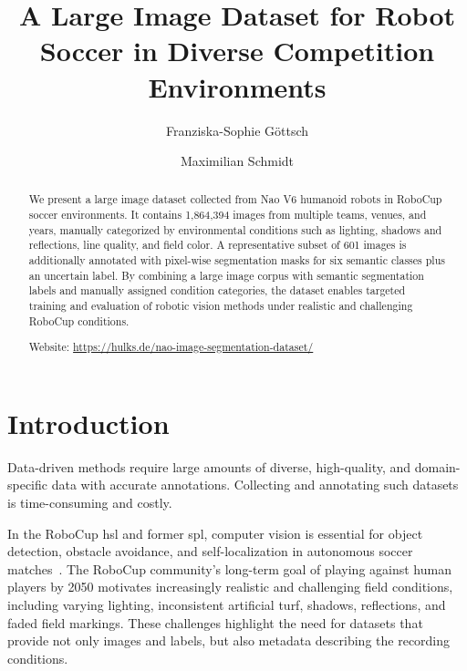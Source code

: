 \documentclass[a4paper, runningheads, orivec]{llncs}
\begin{document}
\title{A Large Image Dataset for Robot Soccer in Diverse Competition Environments}


\author{Franziska-Sophie Göttsch \and Maximilian Schmidt}


\maketitle

\begin{abstract}
	We present a large image dataset collected from Nao V6 humanoid robots in RoboCup soccer environments.
	It contains 1,864,394 images from multiple teams, venues, and years, manually categorized by environmental conditions such as lighting, shadows and reflections, line quality, and field color.
	A representative subset of 601 images is additionally annotated with pixel-wise segmentation masks for six semantic classes plus an uncertain label.
	By combining a large image corpus with semantic segmentation labels and manually assigned condition categories, the dataset enables targeted training and evaluation of robotic vision methods under realistic and challenging RoboCup conditions.

	Website: \url{https://hulks.de/nao-image-segmentation-dataset/}

\end{abstract}

\glsresetall{}

\section{Introduction}

Data-driven methods require large amounts of diverse, high-quality, and domain-specific data with accurate annotations.
Collecting and annotating such datasets is time-consuming and costly.

In the RoboCup \gls{hsl} and former \gls{spl}, computer vision is essential for object detection, obstacle avoidance, and self-localization in autonomous soccer matches~\cite{qianAdaptiveFieldDetection2017}.
The RoboCup community's long-term goal of playing against human players by 2050 motivates increasingly realistic and challenging field conditions, including varying lighting, inconsistent artificial turf, shadows, reflections, and faded field markings.
These challenges highlight the need for datasets that provide not only images and labels, but also metadata describing the recording conditions.
\end{document}
